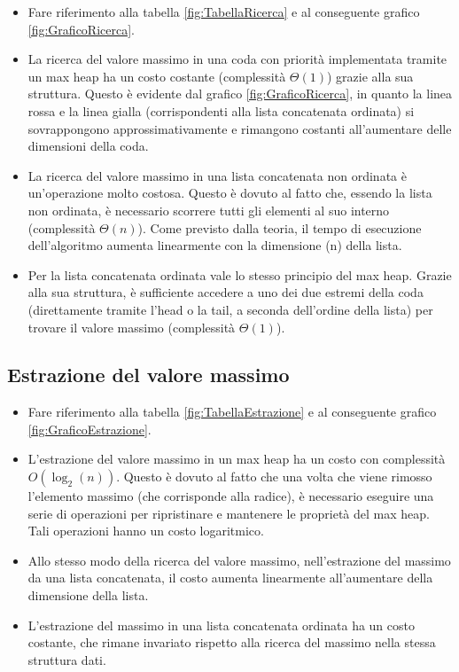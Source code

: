 \documentclass{article}
\begin{document}
\begin{itemize}
\item Fare riferimento alla tabella \ref{fig:TabellaRicerca} e al conseguente grafico \ref{fig:GraficoRicerca}.

\item La ricerca del valore massimo in una coda con priorità implementata tramite un max heap ha un costo costante (complessità $\Theta(1)$) grazie alla sua struttura. Questo è evidente dal grafico \ref{fig:GraficoRicerca}, in quanto la linea rossa e la linea gialla (corrispondenti alla lista concatenata ordinata) si sovrappongono approssimativamente e rimangono costanti all'aumentare delle dimensioni della coda.

\item La ricerca del valore massimo in una lista concatenata non ordinata è un'operazione molto costosa. Questo è dovuto al fatto che, essendo la lista non ordinata, è necessario scorrere tutti gli elementi al suo interno (complessità $\Theta(n)$). Come previsto dalla teoria, il tempo di esecuzione dell'algoritmo aumenta linearmente con la dimensione (n) della lista.

\item Per la lista concatenata ordinata vale lo stesso principio del max heap. Grazie alla sua struttura, è sufficiente accedere a uno dei due estremi della coda (direttamente tramite l'head o la tail, a seconda dell'ordine della lista) per trovare il valore massimo (complessità $\Theta(1)$).

\end{itemize}

\subsection{Estrazione del valore massimo}

\begin{itemize}
\item Fare riferimento alla tabella \ref{fig:TabellaEstrazione} e al conseguente grafico \ref{fig:GraficoEstrazione}.

\item L'estrazione del valore massimo in un max heap ha un costo con complessità $O(\log_2(n))$. Questo è dovuto al fatto che una volta che viene rimosso l'elemento massimo (che corrisponde alla radice), è necessario eseguire una serie di operazioni per ripristinare e mantenere le proprietà del max heap. Tali operazioni hanno un costo logaritmico.

\item Allo stesso modo della ricerca del valore massimo, nell'estrazione del massimo da una lista concatenata, il costo aumenta linearmente all'aumentare della dimensione della lista.

\item L'estrazione del massimo in una lista concatenata ordinata ha un costo costante, che rimane invariato rispetto alla ricerca del massimo nella stessa struttura dati.

\end{itemize}
\end{document}
